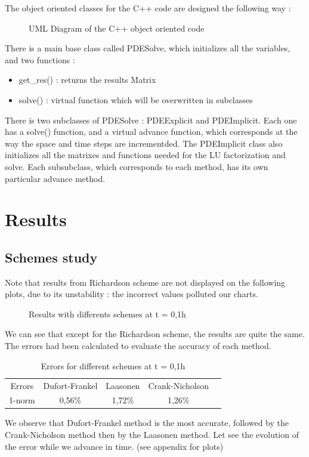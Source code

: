 \documentclass{article}
\begin{document}
                The object oriented classes for the C++ code are designed the following way :\\
                \begin{figure}[H]
                    \caption{UML Diagram of the C++ object oriented code}
                \end{figure}
                There is a main base class called PDESolve, which initializes all the variables, and two functions :
                \begin{itemize}
                    \item{get\_res() : returns the results Matrix}
                    \item{solve() : virtual function which will be overwritten in subclasses}
                \end{itemize}
                There is two subclasses of PDESolve : PDEExplicit and PDEImplicit. Each one has a solve() function, and a virtual advance function,
                which corresponds at the way the space and time steps are incrementded.
                The PDEImplicit class also initializes all the matrixes and functions needed for the LU factorization and solve.
                Each subsubclass, which corresponds to each method, has its own particular advance method.
        \newpage
        \section{Results}
            \subsection{Schemes study}
                Note that results from Richardson scheme are not displayed on the following plots, due to its unstability \cite{rich}: 
            the incorrect values polluted our charts.
            \begin{figure}[H]
                \caption{Results with differents schemes at t = 0,1h}
            \end{figure}
            We can see that except for the Richardson scheme, the results are quite the same. The errors had been calculated 
            to evaluate the accuracy of each method.
            \begin{table}[H]
                \centering
                \caption{Errors for different schemes at t = 0,1h}
                \begin{tabular}{|c|c|c|c|l}
                \cline{1-4}
                Errors & Dufort-Frankel & Laasonen & Crank-Nicholson &  \\ \cline{1-4}
                1-norm & 0,56\%         & 1,72\%   & 1,26\%          &  \\ \cline{1-4}
                \end{tabular}
            \end{table}
            We observe that Dufort-Frankel method is the most accurate, 
            followed by the Crank-Nicholson method then by the Laasonen method. Let see the evolution of the error
            while we advance in time. (see appendix for plots)
            
\end{document}
